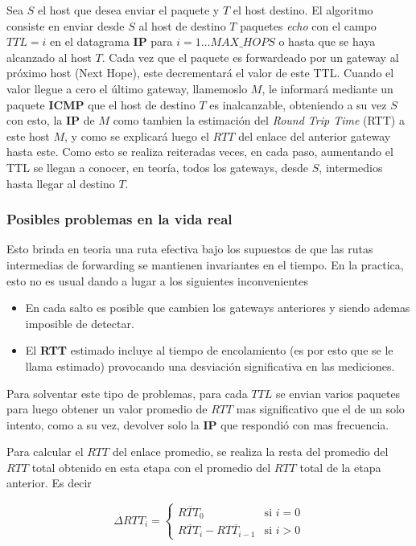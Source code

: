 Sea $S$ el host que desea enviar el paquete y $T$ el host destino.
El algoritmo consiste en enviar desde $S$ al host de destino $T$ paquetes
\emph{echo} con el campo $TTL=i$ en el datagrama \textbf{IP} para $i=1 \dots
MAX\_HOPS$ o hasta que se haya alcanzado al host $T$. Cada vez que el paquete
es forwardeado por un gateway al próximo host (Next Hope), este decrementará el
valor de este TTL. Cuando el valor llegue a cero el último gateway, llamemoslo
$M$, le informará mediante un paquete \textbf{ICMP} que el host de destino $T$
es inalcanzable, obteniendo a su vez $S$ con esto, la \textbf{IP} de $M$ como
tambien la estimación del \textit{Round
Trip Time} (RTT) a este host $M$, y como se explicará luego el $RTT$ del enlace
del anterior gateway hasta este. Como esto se realiza reiteradas veces, en
cada paso, aumentando el TTL se llegan a conocer, en teoría, todos los
gateways, desde $S$, intermedios hasta llegar al destino $T$. 

\subsubsection{Posibles problemas en la vida real}

Esto brinda en teoria una ruta efectiva bajo los supuestos de que
las rutas intermedias de forwarding se mantienen invariantes en el tiempo. En
la practica, esto no es usual dando a lugar a los siguientes inconvenientes

\begin{itemize}
	\item En cada salto es posible que cambien los gateways anteriores y siendo
	ademas imposible de detectar.
	\item El \textbf{RTT} estimado incluye al tiempo de encolamiento (es por esto
	que se le llama estimado) provocando una desviación significativa en las
	mediciones.
\end{itemize}

Para solventar este tipo de problemas, para cada $TTL$ se envian varios paquetes
para luego obtener un valor promedio de $RTT$ mas significativo que el de un
solo intento, como a su vez, devolver solo la \textbf{IP} que respondió con mas
frecuencia.

Para calcular el $RTT$ del enlace promedio, se realiza la resta
del promedio del $RTT$ total obtenido en esta etapa con el promedio del $RTT$ total
de la etapa anterior.
Es decir

\begin{equation}
	\Delta RTT_{i} = \left\{
		\begin{array}{cl}
			\overline{RTT_{0}} & \mbox{si } i = 0\\
			\overline{RTT_{i}} - \overline{RTT_{i-1}} & \mbox{si } i > 0
		\end{array}
		\right.
\end{equation}

